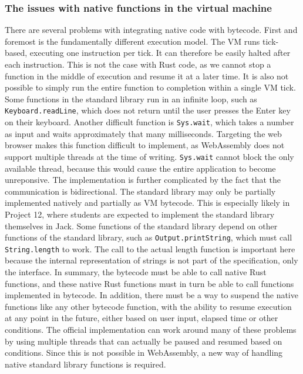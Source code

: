 \subsubsection{The issues with native functions in the virtual machine} \label{stdlib-issues}
There are several problems with integrating native code with bytecode.
First and foremost is the fundamentally different execution model. The VM runs tick-based, executing one instruction per tick. It can therefore be easily halted after each instruction.
This is not the case with Rust code, as we cannot stop a function in the middle of execution and resume it at a later time.
It is also not possible to simply run the entire function to completion within a single VM tick. Some functions in the standard library run in an infinite loop, such as \verb+Keyboard.readLine+, which does not return until the user presses the Enter key on their keyboard.
Another difficult function is \verb+Sys.wait+, which takes a number as input and waits approximately that many milliseconds.
Targeting the web browser makes this function difficult to implement, as WebAssembly does not support multiple threads at the time of writing. \verb+Sys.wait+ cannot block the only available thread, because this would cause the entire application to become unreponsive.
The implementation is further complicated by the fact that the communication is bidirectional. The standard library may only be partially implemented natively and partially as VM bytecode. This is especially likely in Project 12, where students are expected to implement the standard library themselves in Jack.
Some functions of the standard library depend on other functions of the standard library, such as \verb+Output.printString+, which must call \verb+String.length+ to work. The call to the actual length function is important here because the internal representation of strings is not part of the specification, only the interface.
In summary, the bytecode must be able to call native Rust functions, and these native Rust functions must in turn be able to call functions implemented in bytecode. In addition, there must be a way to suspend the native functions like any other bytecode function, with the ability to resume execution at any point in the future, either based on user input, elapsed time or other conditions.
The official implementation can work around many of these problems by using multiple threads that can actually be paused and resumed based on conditions.
Since this is not possible in WebAssembly, a new way of handling native standard library functions is required.

